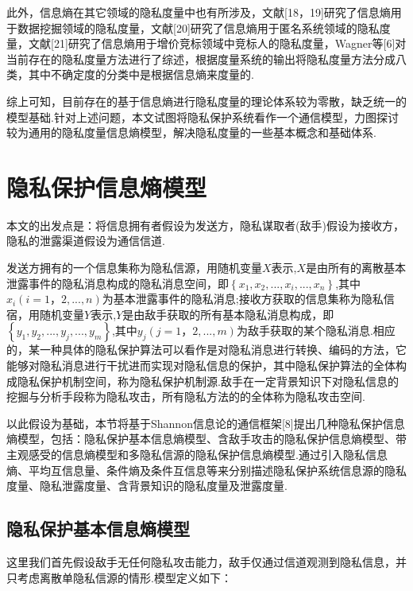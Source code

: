 此外，信息熵在其它领域的隐私度量中也有所涉及，文献[18，19]研究了信息熵用于数据挖掘领域的隐私度量，文献[20]研究了信息熵用于匿名系统领域的隐私度量，文献[21]研究了信息熵用于增价竞标领域中竞标人的隐私度量，Wagner等[6]对当前存在的隐私度量方法进行了综述，根据度量系统的输出将隐私度量方法分成八类，其中不确定度的分类中是根据信息熵来度量的.

综上可知，目前存在的基于信息熵进行隐私度量的理论体系较为零散，缺乏统一的模型基础.针对上述问题，本文试图将隐私保护系统看作一个通信模型，力图探讨较为通用的隐私度量信息熵模型，解决隐私度量的一些基本概念和基础体系.

\section{隐私保护信息熵模型}\label{Entropy model of privacy protection information}

本文的出发点是：将信息拥有者假设为发送方，隐私谋取者(敌手)假设为接收方，隐私的泄露渠道假设为通信信道.

发送方拥有的一个信息集称为隐私信源，用随机变量$X$表示,$X$是由所有的离散基本泄露事件的隐私消息构成的隐私消息空间，即$\left \{ x_{1},x_{2},...,x_{i},...,x_{n} \right \}$,其中$x_{i}(i=1，2,...,n)$为基本泄露事件的隐私消息;接收方获取的信息集称为隐私信宿，用随机变量$Y$表示,$Y$是由敌手获取的所有基本隐私消息构成，即$\left \{y_{1},y_{2},...,y_{j},...,y_{m} \right \}$,其中$y_{j}(j=1，2,...,m)$为敌手获取的某个隐私消息.相应的，某一种具体的隐私保护算法可以看作是对隐私消息进行转换、编码的方法，它能够对隐私消息进行干扰进而实现对隐私信息的保护，其中隐私保护算法的全体构成隐私保护机制空间，称为隐私保护机制源.敌手在一定背景知识下对隐私信息的挖掘与分析手段称为隐私攻击，所有隐私方法的的全体称为隐私攻击空间.

以此假设为基础，本节将基于Shannon信息论的通信框架[8]提出几种隐私保护信息熵模型，包括：隐私保护基本信息熵模型、含敌手攻击的隐私保护信息熵模型、带主观感受的信息熵模型和多隐私信源的隐私保护信息熵模型.通过引入隐私信息熵、平均互信息量、条件熵及条件互信息等来分别描述隐私保护系统信息源的隐私度量、隐私泄露度量、含背景知识的隐私度量及泄露度量.

\subsection{隐私保护基本信息熵模型}

这里我们首先假设敌手无任何隐私攻击能力，敌手仅通过信道观测到隐私信息，并只考虑离散单隐私信源的情形.模型定义如下：
\begin{figure}
	
\end{figure}


